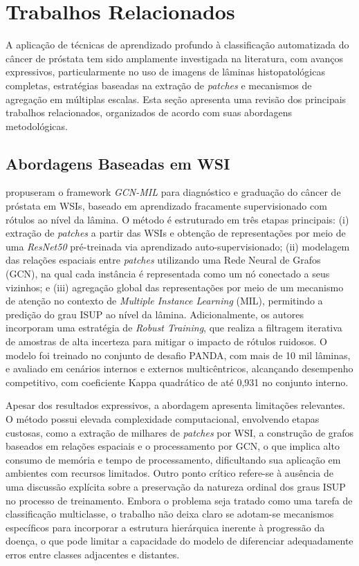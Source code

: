 \chapter{Trabalhos Relacionados}
\label{cap:trabalhos-relacionados}

A aplicação de técnicas de aprendizado profundo à classificação automatizada do câncer de próstata tem sido amplamente investigada na literatura, com avanços expressivos, particularmente no uso de imagens de lâminas histopatológicas completas, estratégias baseadas na extração de \textit{patches} e mecanismos de agregação em múltiplas escalas. Esta seção apresenta uma revisão dos principais trabalhos relacionados, organizados de acordo com suas abordagens metodológicas.

\section{Abordagens Baseadas em WSI}

 propuseram o framework \textit{GCN-MIL} para diagnóstico e graduação do câncer de próstata em WSIs, baseado em aprendizado fracamente supervisionado com rótulos ao nível da lâmina. O método é estruturado em três etapas principais: (i) extração de \textit{patches} a partir das WSIs e obtenção de representações por meio de uma \textit{ResNet50} pré-treinada via aprendizado auto-supervisionado; (ii) modelagem das relações espaciais entre \textit{patches} utilizando uma Rede Neural de Grafos (GCN), na qual cada instância é representada como um nó conectado a seus vizinhos; e (iii) agregação global das representações por meio de um mecanismo de atenção no contexto de \textit{Multiple Instance Learning} (MIL), permitindo a predição do grau ISUP ao nível da lâmina. Adicionalmente, os autores incorporam uma estratégia de \textit{Robust Training}, que realiza a filtragem iterativa de amostras de alta incerteza para mitigar o impacto de rótulos ruidosos. O modelo foi treinado no conjunto de desafio PANDA, com mais de 10 mil lâminas, e avaliado em cenários internos e externos multicêntricos, alcançando desempenho competitivo, com coeficiente Kappa quadrático de até 0,931 no conjunto interno.

Apesar dos resultados expressivos, a abordagem apresenta limitações relevantes. O método possui elevada complexidade computacional, envolvendo etapas custosas, como a extração de milhares de \textit{patches} por WSI, a construção de grafos baseados em relações espaciais e o processamento por GCN, o que implica alto consumo de memória e tempo de processamento, dificultando sua aplicação em ambientes com recursos limitados. Outro ponto crítico refere-se à ausência de uma discussão explícita sobre a preservação da natureza ordinal dos graus ISUP no processo de treinamento. Embora o problema seja tratado como uma tarefa de classificação multiclasse, o trabalho não deixa claro se adotam-se mecanismos específicos para incorporar a estrutura hierárquica inerente à progressão da doença, o que pode limitar a capacidade do modelo de diferenciar adequadamente erros entre classes adjacentes e distantes.

